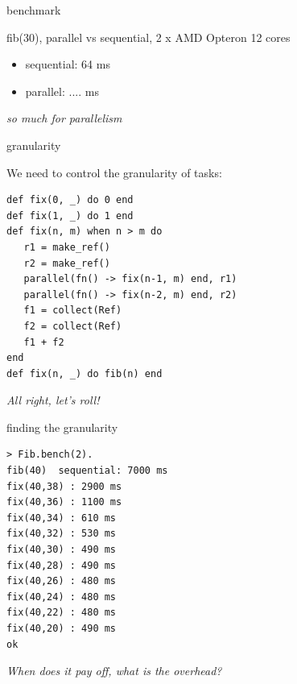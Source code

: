 \begin{frame}{benchmark}

fib(30),  parallel vs sequential, 2 x AMD Opteron 12 cores

\pause\vspace{20pt}

\begin{itemize}
\pause \item sequential: 64 ms 
\pause \item parallel: \pause ....  ms
\end{itemize}

\vspace{20pt}
{\em so much for parallelism}

\end{frame} 

\begin{frame}[fragile]{granularity}

We need to control the granularity of tasks:

 \begin{verbatim}
def fix(0, _) do 0 end
def fix(1, _) do 1 end
def fix(n, m) when n > m do 
   r1 = make_ref()
   r2 = make_ref()
   parallel(fn() -> fix(n-1, m) end, r1)
   parallel(fn() -> fix(n-2, m) end, r2)
   f1 = collect(Ref)
   f2 = collect(Ref)
   f1 + f2
end
def fix(n, _) do fib(n) end
\end{verbatim}

\pause\vspace{20pt}
{\em All right, let's roll!}
\end{frame}

\begin{frame}[fragile]{finding the granularity}

\begin{verbatim}
> Fib.bench(2).
fib(40)  sequential: 7000 ms
fix(40,38) : 2900 ms
fix(40,36) : 1100 ms
fix(40,34) : 610 ms
fix(40,32) : 530 ms
fix(40,30) : 490 ms
fix(40,28) : 490 ms
fix(40,26) : 480 ms
fix(40,24) : 480 ms
fix(40,22) : 480 ms
fix(40,20) : 490 ms
ok
\end{verbatim}

{\em When does it pay off, what is the overhead?}

\end{frame}

